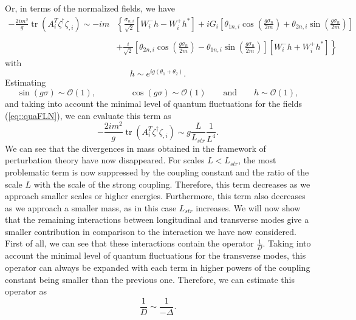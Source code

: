 \documentclass{article}
\DeclareMathOperator{\tr}{tr}
\begin{document}
Or, in terms of the normalized fields, we have
\begin{equation}
    \begin{split}
        -\frac{2im^2}{g}\tr\left(A_i^T\zeta^{\dagger}\zeta_{,i}\right)\sim-im&\left\{\frac{\sigma_{n,i}}{\sqrt{2}}[W_i^-h-W_i^+h^*]+iG_i\left[\theta_{1n,i}\cos\left(\frac{g\sigma_n}{2m}\right)+\theta_{2n,i}\sin\left(\frac{g\sigma_n}{2m}\right)\right]\right.\\\\
        &\left.+\frac{i}{\sqrt{2}}\left[\theta_{2n,i}\cos\left(\frac{g\sigma_n}{2m}\right)-\theta_{1n,i}\sin\left(\frac{g\sigma_n}{2m}\right)\right][W_i^-h+W_i^+h^*]\right\}
    \end{split}
\end{equation}
 with
\begin{equation}
    h\sim e^{ig(\theta_1+\theta_2)}.
\end{equation}
Estimating 
\begin{equation}
    \sin(g\sigma)\sim\mathcal{O}(1),\qquad\qquad\cos(g\sigma)\sim\mathcal{O}(1)\qquad\text{and}\qquad h\sim\mathcal{O}(1),
\end{equation}
and taking into account the minimal level of quantum fluctuations for the fields (\ref{eq::quaFLN}), we can evaluate this term as 
\begin{equation}\label{eq::probint}
    -\frac{2im^2}{g}\tr\left(A_i^T\zeta^{\dagger}\zeta_{,i}\right)\sim g\frac{L}{L_{str}}\frac{1}{L^4}.
\end{equation}
We can see that the divergences in mass obtained in the framework of perturbation theory have now disappeared. For scales $L<L_{str}$, the most problematic term is now suppressed by the coupling constant and the ratio of the scale $L$ with the scale of the strong coupling. Therefore, this term decreases as we approach smaller scales or higher energies. Furthermore, this term also decreases as we approach a smaller mass, as in this case $L_{str}$ increases.
We will now show that the remaining interactions between longitudinal and transverse modes give a smaller contribution in comparison to the interaction we have now considered. First of all, we can see that these interactions contain the operator $\frac{1}{D}$. Taking into account the minimal level of quantum fluctuations for the transverse modes, this operator can always be expanded with each term in higher powers of the coupling constant being smaller than the previous one. Therefore, we can estimate this operator as 
\begin{equation}
    \frac{1}{D}\sim\frac{1}{-\Delta}.
\end{equation}
\end{document}
